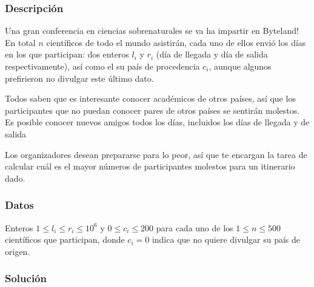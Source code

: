 %
%
%
%

\subsubsection{Descripción}

Una gran conferencia en ciencias sobrenaturales se va ha impartir en Byteland! En total \(n\) científicos de todo el mundo asistirán, cada uno de ellos envió los días en los que participan: dos enteros \(l_i\) y \(r_i\) (día de llegada y día de salida respectivamente), así como el su país de procedencia \(c_i\), aunque algunos prefirieron no divulgar este último dato.

Todos saben que es interesante conocer académicos de otros países, así que los participantes que no puedan conocer pares de otros países se sentirán molestos. Es posible conocer nuevos amigos todos los días, incluidos los días de llegada y de salida

Los organizadores desean prepararse para lo peor, así que te encargan la tarea de calcular cuál es el mayor números de participantes molestos para un itinerario dado.

\subsubsection{Datos}

Enteros \(1\leq l_i\leq r_i\leq 10^6\) y \(0\leq c_i\leq 200\) para cada uno de los \(1\leq n\leq 500\) científicos que participan, donde \(c_i=0\) indica que no quiere divulgar su país de origen.

\subsubsection{Solución}

